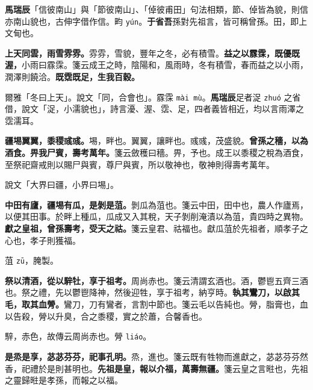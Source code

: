 \begin{quoting}\textbf{馬瑞辰}「信彼南山」與「節彼南山」、「倬彼甫田」句法相類，節、倬皆為貌，則信亦南山貌也，古伸字借作信。畇 \texttt{yún}。\textbf{于省吾}孫對先祖言，皆可稱曾孫。田，即上文甸也。\end{quoting}

\textbf{上天同雲，雨雪雰雰。}{\footnotesize 雰雰，雪貌，豐年之冬，必有積雪。}\textbf{益之以霡霂，既優既渥，}{\footnotesize 小雨曰霡霂。箋云成王之時，陰陽和，風雨時，冬有積雪，春而益之以小雨，潤澤則饒洽。}\textbf{既霑既足，生我百穀。}

\begin{quoting}爾雅「冬曰上天」。說文「同，合會也」。霡霂 \texttt{mài mù}。\textbf{馬瑞辰}足者浞 \texttt{zhuó} 之省借，說文「浞，小濡貌也」，詩言瀀、渥、霑、足，四者義皆相近，均以言雨澤之霑濡耳。\end{quoting}

\textbf{疆埸翼翼，黍稷彧彧。}{\footnotesize 埸，畔也。翼翼，讓畔也。彧彧，茂盛貌。}\textbf{曾孫之穡，以為酒食。畀我尸賓，壽考萬年。}{\footnotesize 箋云斂穫曰穡。畀，予也。成王以黍稷之稅為酒食，至祭祀齋戒則以賜尸與賓，尊尸與賓，所以敬神也，敬神則得壽考萬年。}

\begin{quoting}說文「大界曰疆，小界曰埸」。\end{quoting}

\textbf{中田有廬，疆埸有瓜，是剝是菹。}{\footnotesize 剝瓜為菹也。箋云中田，田中也，農人作廬焉，以便其田事。於畔上種瓜，瓜成又入其稅，天子剝削淹漬以為菹，貴四時之異物。}\textbf{獻之皇祖，曾孫壽考，受天之祜。}{\footnotesize 箋云皇君、祜福也。獻瓜菹於先祖者，順孝子之心也，孝子則獲福。}

\begin{quoting}菹 \texttt{zū}，腌製。\end{quoting}

\textbf{祭以清酒，從以騂牡，享于祖考。}{\footnotesize 周尚赤也。箋云清謂玄酒也。酒，鬱鬯五齊三酒也。祭之禮，先以鬱鬯降神，然後迎牲，享于祖考，納亨時。}\textbf{執其鸞刀，以啟其毛，取其血膋。}{\footnotesize 鸞刀，刀有鸞者，言割中節也。箋云毛以告純也。膋，脂膏也，血以告殺，膋以升臭，合之黍稷，實之於蕭，合馨香也。}

\begin{quoting}騂，赤色，故傳云周尚赤也。膋 \texttt{liáo}。\end{quoting}

\textbf{是烝是享，苾苾芬芬，祀事孔明。}{\footnotesize 烝，進也。箋云既有牲物而進獻之，苾苾芬芬然香，祀禮於是則甚明也。}\textbf{先祖是皇，報以介福，萬壽無疆。}{\footnotesize 箋云皇之言暀也，先祖之靈歸暀是孝孫，而報之以福。}

